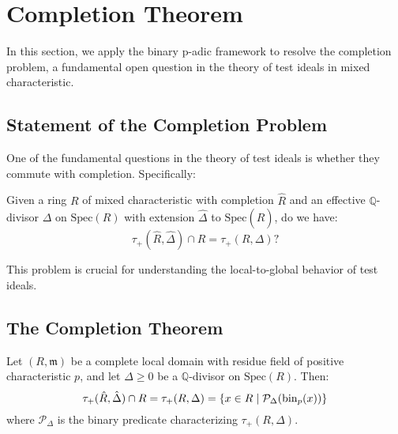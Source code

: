 \section{Completion Theorem}\label{sec:completion_theorem}

In this section, we apply the binary p-adic framework to resolve the completion problem, a fundamental open question in the theory of test ideals in mixed characteristic.

\subsection{Statement of the Completion Problem}

One of the fundamental questions in the theory of test ideals is whether they commute with completion. Specifically:

\begin{problem}\label{prob:completion}
Given a ring $R$ of mixed characteristic with completion $\hat{R}$ and an effective $\mathbb{Q}$-divisor $\Delta$ on $\text{Spec}(R)$ with extension $\hat{\Delta}$ to $\text{Spec}(\hat{R})$, do we have:
$$\tau_+(\hat{R},\hat{\Delta}) \cap R = \tau_+(R,\Delta) \text{?}$$
\end{problem}

This problem is crucial for understanding the local-to-global behavior of test ideals.

\subsection{The Completion Theorem}

\begin{theorem}\label{thm:completion}
Let $(R,\mathfrak{m})$ be a complete local domain with residue field of positive characteristic $p$, and let $\Delta \geq 0$ be a $\mathbb{Q}$-divisor on $\text{Spec}(R)$. Then:
$$\tau_+(\hat{R},\hat{\Delta}) \cap R = \tau_+(R,\Delta) = \{x \in R \mid \mathcal{P}_\Delta(\operatorname{bin}_p(x))\}$$
where $\mathcal{P}_\Delta$ is the binary predicate characterizing $\tau_+(R,\Delta)$.
\end{theorem}

